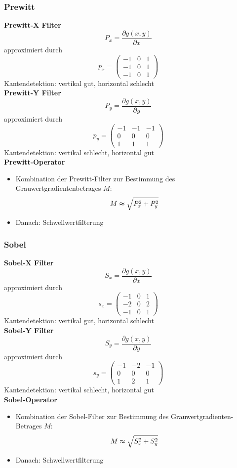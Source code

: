 \subsubsection{Prewitt}

\textbf{Prewitt-X Filter} $$P_x = \frac{\partial g(x,y)}{\partial x}$$ approximiert durch $$p_x = \left( \begin{array}{ccc} -1 & 0 & 1 \\ -1 & 0 & 1 \\ -1 & 0 & 1 \end{array} \right)$$
Kantendetektion: vertikal gut, horizontal schlecht \\
\textbf{Prewitt-Y Filter} $$P_y = \frac{\partial g(x,y)}{\partial y}$$ approximiert durch $$p_y = \left( \begin{array}{rrr} -1 & -1 & -1 \\ 0 & 0 & 0 \\ 1 & 1 & 1 \end{array} \right)$$
Kantendetektion: vertikal schlecht, horizontal gut \\
\textbf{Prewitt-Operator}
\begin{itemize}
\item Kombination der Prewitt-Filter zur Bestimmung des Grauwertgradientenbetrages $M$: $$M \thickapprox \sqrt{P_x^2 + P_y^2}$$
\item Danach: Schwellwertfilterung
\end{itemize}

\subsubsection{Sobel}

\textbf{Sobel-X Filter} $$S_x = \frac{\partial g(x,y)}{\partial x}$$ approximiert durch $$s_x = \left( \begin{array}{ccc} -1 & 0 & 1 \\ -2 & 0 & 2 \\ -1 & 0 & 1 \end{array} \right)$$
Kantendetektion: vertikal gut, horizontal schlecht \\
\textbf{Sobel-Y Filter} $$S_y = \frac{\partial g(x,y)}{\partial y}$$ approximiert durch $$s_y = \left( \begin{array}{rrr} -1 & -2 & -1 \\ 0 & 0 & 0 \\ 1 & 2 & 1 \end{array} \right)$$
Kantendetektion: vertikal schlecht, horizontal gut \\
\textbf{Sobel-Operator}
\begin{itemize}
\item Kombination der Sobel-Filter zur Bestimmung des Grauwertgradienten-Betrages $M$: $$M \thickapprox \sqrt{S_x^2 + S_y^2}$$
\item Danach: Schwellwertfilterung
\end{itemize}

